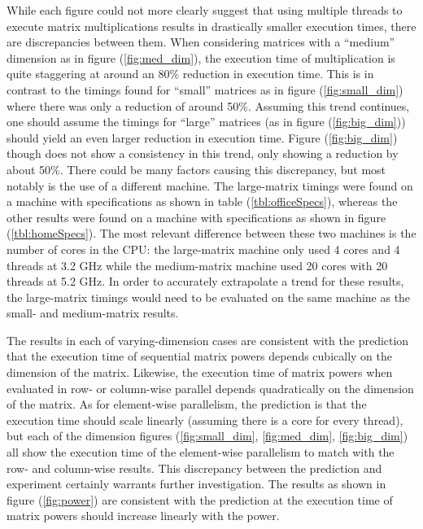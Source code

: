 \documentclass{article}
\begin{document}
    While each figure could not more clearly suggest that using multiple threads to execute matrix multiplications results in drastically smaller execution times, there are discrepancies between them.  When considering matrices with a ``medium'' dimension as in figure (\ref{fig:med_dim}), the execution time of multiplication is quite staggering at around an 80\% reduction in execution time.  This is in contrast to the timings found for ``small'' matrices as in figure (\ref{fig:small_dim}) where there was only a reduction of around 50\%.  Assuming this trend continues, one should assume the timings for ``large'' matrices (as in figure (\ref{fig:big_dim})) should yield an even larger reduction in execution time.  Figure (\ref{fig:big_dim}) though does not show a consistency in this trend, only showing a reduction by about 50\%.  There could be many factors causing this discrepancy, but most notably is the use of a different machine.  The large-matrix timings were found on a machine with specifications as shown in table (\ref{tbl:officeSpecs}), whereas the other results were found on a machine with specifications as shown in figure (\ref{tbl:homeSpecs}).  The most relevant difference between these two machines is the number of cores in the CPU: the large-matrix machine only used 4 cores and 4 threads at 3.2 GHz while the medium-matrix machine used 20 cores with 20 threads at 5.2 GHz.  In order to accurately extrapolate a trend for these results, the large-matrix timings would need to be evaluated on the same machine as the small- and medium-matrix results.  
    
    The results in each of varying-dimension cases are consistent with the prediction that the execution time of sequential matrix powers depends cubically on the dimension of the matrix.  Likewise, the execution time of matrix powers when evaluated in row- or column-wise parallel depends quadratically on the dimension of the matrix.  As for element-wise parallelism, the prediction is that the execution time should scale linearly (assuming there is a core for every thread), but each of the dimension figures (\ref{fig:small_dim}, \ref{fig:med_dim}, \ref{fig:big_dim}) all show the execution time of the element-wise parallelism to match with the row- and column-wise results.  This discrepancy between the prediction and experiment certainly warrants further investigation.  The results as shown in figure (\ref{fig:power}) are consistent with the prediction at the execution time of matrix powers should increase linearly with the power.
\end{document}
